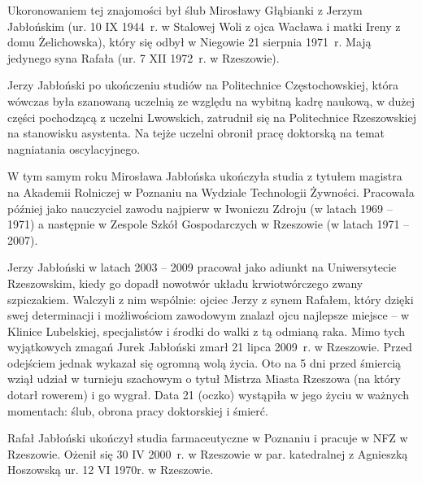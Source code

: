 Ukoronowaniem tej znajomości był ślub Mirosławy Głąbianki z Jerzym Jabłońskim (ur. 10 IX 1944~r. w Stalowej Woli z ojca Wacława i matki Ireny z domu Żelichowska), który się odbył w Niegowie 21 sierpnia 1971~r. Mają jedynego syna Rafała (ur. 7 XII 1972~r. w Rzeszowie).

Jerzy Jabłoński po ukończeniu studiów na Politechnice Częstochowskiej, która wówczas była szanowaną uczelnią ze względu na wybitną kadrę naukową, w dużej części pochodzącą z uczelni Lwowskich, zatrudnił się na Politechnice Rzeszowskiej na stanowisku asystenta. Na tejże uczelni obronił pracę doktorską na temat nagniatania oscylacyjnego. 

W tym samym roku Mirosława Jabłońska ukończyła studia z tytułem magistra na Akademii Rolniczej w Poznaniu na Wydziale Technologii Żywności. Pracowała później jako nauczyciel zawodu najpierw w Iwoniczu Zdroju (w latach 1969 – 1971) a następnie w Zespole Szkół Gospodarczych w Rzeszowie (w latach 1971 – 2007). 

Jerzy Jabłoński w latach 2003 -- 2009 pracował jako adiunkt na Uniwersytecie Rzeszowskim, kiedy go dopadł nowotwór układu krwiotwórczego zwany szpiczakiem. Walczyli z nim wspólnie: ojciec Jerzy z synem Rafałem, który dzięki swej determinacji i możliwościom zawodowym znalazł ojcu najlepsze miejsce -- w Klinice Lubelskiej, specjalistów i środki do walki z tą odmianą raka. Mimo tych wyjątkowych zmagań Jurek Jabłoński zmarł 21 lipca 2009~r. w Rzeszowie. Przed odejściem jednak wykazał się ogromną wolą życia.
Oto na 5 dni przed śmiercią wziął udział w turnieju szachowym o tytuł Mistrza Miasta Rzeszowa (na który dotarł rowerem) i go wygrał. Data 21 (oczko) wystąpiła w jego życiu w ważnych momentach: ślub, obrona pracy doktorskiej i śmierć.

Rafał Jabłoński ukończył studia farmaceutyczne w Poznaniu i pracuje w NFZ w Rzeszowie. Ożenił się 30 IV 2000~r. w Rzeszowie w par. katedralnej z Agnieszką Hoszowską ur. 12 VI 1970r. w Rzeszowie.

